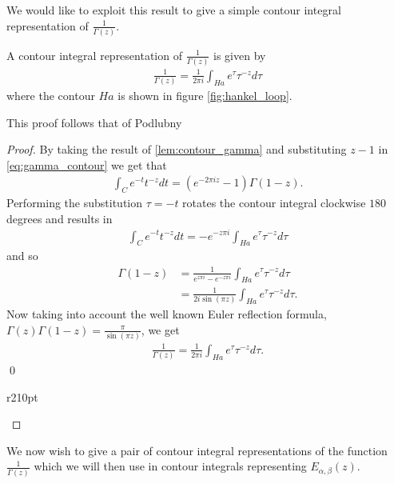 We would like to exploit this result to give a simple contour integral representation of $ \frac{1}{\Gamma(z)} $.

\begin{lemma}
    \label{lem:contour_1_gamma_1}
    A contour integral representation of $ \frac{1}{\Gamma(z)} $ is given by
    \begin{align*}
        \frac{1}{\Gamma(z)} = \frac{1}{2 \pi i} \int_{Ha} e^\tau \tau^{-z} d\tau
    \end{align*}
    where the contour $ Ha $ is shown in figure \ref{fig:hankel_loop}.
\end{lemma}
This proof follows that of Podlubny \cite{Podlubny1999}
\begin{proof}
    By taking the result of \ref{lem:contour_gamma} and substituting $ z-1 $ in \eqref{eq:gamma_contour}
    we get that
    \begin{align*}
        \int_C e^{-t} t^{-z} dt = (e^{-2 \pi i z} -1) \Gamma(1-z).
    \end{align*}
    Performing the substitution $ \tau = -t $ rotates the contour integral clockwise $ 180 $ degrees 
    and results in 
    \begin{align*}
        \int_{C} e^{-t} t^{-z} dt = - e^{-z\pi i}\int_{Ha} e^{\tau} \tau^{-z} d\tau
    \end{align*}
    and so
    \begin{align*}
        \Gamma(1-z) &= \frac{1}{e^{z\pi i} - e^{-z \pi i}} \int_{Ha} e^\tau \tau^{-z} d\tau \\
            &= \frac{1}{2i \sin(\pi z)}\int_{Ha} e^\tau \tau^{-z} d\tau.
    \end{align*}
    Now taking into account the well known Euler reflection formula, $ \Gamma(z)\Gamma(1-z) = \frac{\pi}{\sin(\pi z)} $, we get
    \begin{align*}
        \frac{1}{\Gamma(z)} = \frac{1}{2 \pi i} \int_{Ha} e^\tau \tau^{-z} d\tau.
    \end{align*} \qed
    \begin{wrapfigure}{r}{210pt}
        
        \caption{The Hankel contour Ha}
        \label{fig:hankel_loop}
    \end{wrapfigure}
\end{proof}

We now wish to give a pair of contour integral representations of the function $ \frac{1}{\Gamma(z)} $
which we will then use in contour integrals representing $ E_{\alpha, \beta}(z) $. 

